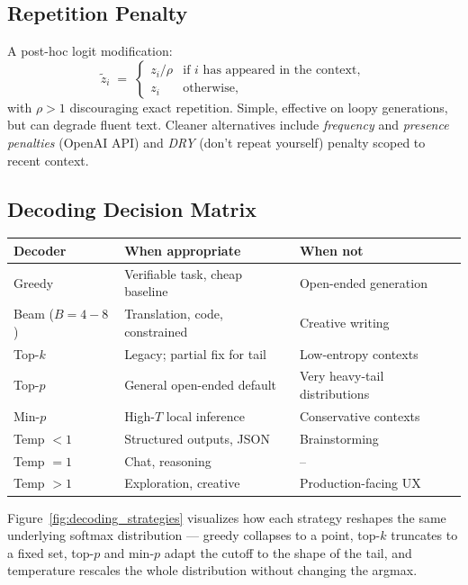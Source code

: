 \subsection{Repetition Penalty}

A post-hoc logit modification:
\begin{equation}
\tilde z_i \;=\; \begin{cases}
z_i / \rho & \text{if $i$ has appeared in the context}, \\
z_i        & \text{otherwise},
\end{cases}
\end{equation}
with $\rho > 1$ discouraging exact repetition. Simple, effective on
loopy generations, but can degrade fluent text. Cleaner alternatives
include \emph{frequency} and \emph{presence penalties} (OpenAI API)
and \emph{DRY} (don't repeat yourself) penalty scoped to recent
context.

\subsection{Decoding Decision Matrix}

\begin{center}
\begin{tabular}{|l|l|l|}
\hline
Decoder & When appropriate & When not \\
\hline
Greedy           & Verifiable task, cheap baseline & Open-ended generation \\
Beam ($B = 4{-}8$) & Translation, code, constrained  & Creative writing \\
Top-$k$          & Legacy; partial fix for tail     & Low-entropy contexts \\
Top-$p$          & General open-ended default        & Very heavy-tail distributions \\
Min-$p$          & High-$T$ local inference          & Conservative contexts \\
Temp $< 1$       & Structured outputs, JSON          & Brainstorming \\
Temp $= 1$       & Chat, reasoning                   & -- \\
Temp $> 1$       & Exploration, creative             & Production-facing UX \\
\hline
\end{tabular}
\end{center}

Figure~\ref{fig:decoding_strategies} visualizes how each strategy
reshapes the same underlying softmax distribution --- greedy
collapses to a point, top-$k$ truncates to a fixed set, top-$p$ and
min-$p$ adapt the cutoff to the shape of the tail, and temperature
rescales the whole distribution without changing the argmax.

